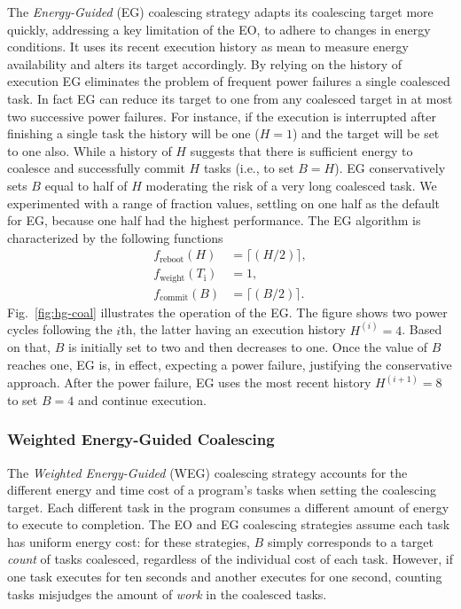 The \emph{Energy-Guided} (EG) coalescing strategy adapts its coalescing target more quickly, addressing a key limitation of the EO, to adhere to changes in energy conditions. It uses its recent execution history as  mean to measure energy availability and alters its target accordingly. By relying on the history of execution EG eliminates the problem of frequent power failures a single coalesced task. In fact EG can reduce its target to one from any coalesced target in at most two successive power failures. For instance, if the execution is interrupted after finishing a single task the history will be one ($H = 1$) and the target will be set to one also. While a history of $H$ suggests that there is sufficient energy to coalesce and successfully commit $H$ tasks (i.e., to set $B = H$). EG conservatively sets $B$ equal to half of $H$ moderating the risk of a very long coalesced task. We experimented with a range of fraction values, settling on one half as the default for EG, because one half had the highest performance. The EG algorithm is characterized by the following functions
%
\begin{equation}
	\begin{split}
		 f_\text{reboot}(H) & = \lceil(H / 2)\rceil,\\
		 f_\text{weight}(T_\text{i}) & = 1, \\
		 f_\text{commit}(B) & = \lceil(B / 2)\rceil.
	\end{split}
	\label{eq:eg}
\end{equation}
%
Fig.~\ref{fig:hg-coal} illustrates the operation of the EG. The figure shows two power cycles following the $i$th, the latter having an
execution history $H^{(i)} = 4$. Based on that, $B$ is initially set to two and then decreases to one. Once the value of $B$ reaches one, EG is, in effect, expecting a power failure, justifying the conservative approach. After the power failure, EG uses the most recent history $H^{(i+1)} = 8$ to set $B = 4$ and continue execution.

\subsubsection{Weighted Energy-Guided Coalescing}
\label{subsec:energyTaskAware}

The \emph{Weighted Energy-Guided} (WEG) coalescing strategy accounts for the different energy and time cost of a program's tasks when setting the coalescing target. Each different task in the program consumes a different amount of energy to execute to completion. The EO and EG coalescing strategies assume each task has uniform energy cost: for these strategies, $B$ simply corresponds to a target {\em count} of tasks coalesced, regardless of the individual cost of each task. However, if one task executes for ten seconds and another executes for one second, counting tasks misjudges the amount of {\em work} in the coalesced tasks.

